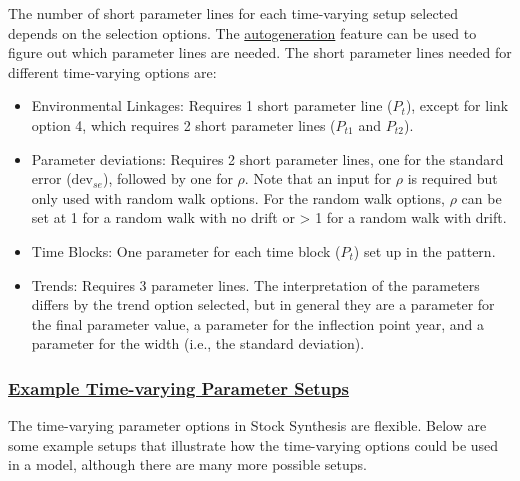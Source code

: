 The number of short parameter lines for each time-varying setup selected depends on the selection options. The \hyperlink{autogen}{autogeneration} feature can be used to figure out which parameter lines are needed. The short parameter lines needed for different time-varying options are:
\begin{itemize}
	\item Environmental Linkages: Requires 1 short parameter line ($P_{t}$), except for link option 4, which requires 2 short parameter lines ($P_{t1}$ and $P_{t2}$).
	\item Parameter deviations: Requires 2 short parameter lines, one for the standard error ($\text{dev}_{se}$), followed by one for $\rho$. Note that an input for $\rho$ is required but only used with random walk options. For the random walk options, $\rho$ can be set at 1 for a random walk with no drift or > 1 for a random walk with drift.
	\item Time Blocks: One parameter for each time block ($P_{t}$) set up in the pattern.
	\item Trends: Requires 3 parameter lines. The interpretation of the parameters differs by the trend option selected, but in general they are a parameter for the final parameter value, a parameter for the inflection point year, and a parameter for the width (i.e., the standard deviation).
\end{itemize}

\hypertarget{ExTVParam}{}
\subsubsection[Example Time-varying Parameter Setups]{\protect\hyperlink{ExTVParam}{Example Time-varying Parameter Setups}}

The time-varying parameter options in Stock Synthesis are flexible. Below are some example setups that illustrate how the time-varying options could be used in a model, although there are many more possible setups.


